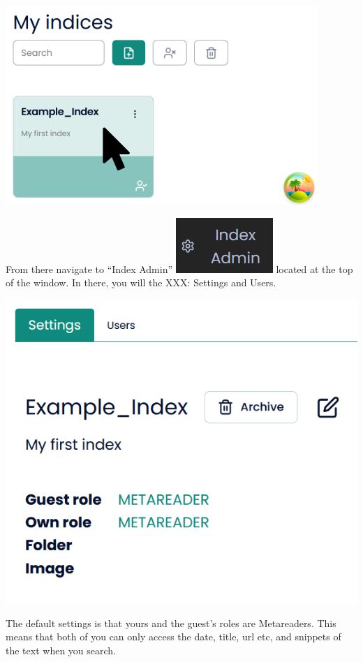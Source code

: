 \documentclass[
  letterpaper,
  DIV=11,
  numbers=noendperiod]{scrreprt}
\begin{document}
\includegraphics{media/amcat-4.1-1.png}

From there navigate to ``Index Admin''
\includegraphics{media/amcat-4.1-2.png} located at the top of the
window. In there, you will the XXX: Settings and Users.

\includegraphics{media/amcat-4.1-3.png}

The default settings is that yours and the guest's roles are
Metareaders. This means that both of you can only access the date,
title, url etc, and snippets of the text when you search.
\end{document}
